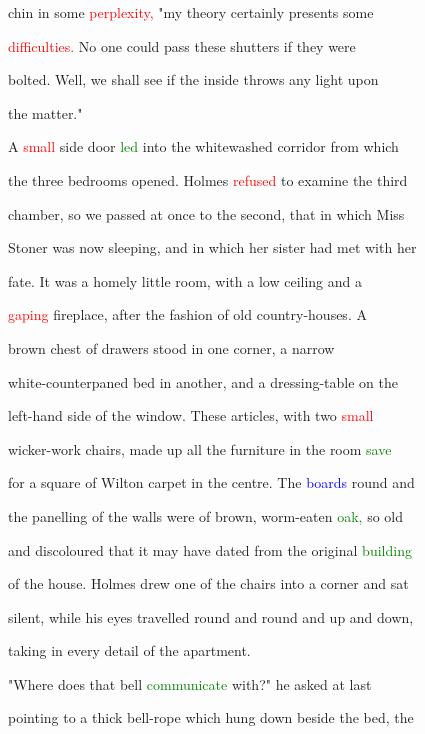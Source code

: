  chin in some \textcolor{red}{perplexity,} "my \textcolor{BurntOrange}{theory} certainly \textcolor{BurntOrange}{presents} some

 \textcolor{red}{difficulties.} No one could pass these shutters if they were

 bolted. Well, we shall see if the inside throws any light upon

 the matter."



 A \textcolor{red}{small} side door \textcolor{green}{led} into the whitewashed corridor from which

 the three bedrooms opened. Holmes \textcolor{red}{refused} to examine the third

 chamber, so we passed at once to the second, that in which Miss

 Stoner was now sleeping, and in which her sister had met with her

 \textcolor{BurntOrange}{fate.} It was a homely little room, with a low ceiling and a

 \textcolor{red}{gaping} fireplace, after the fashion of old country-houses. A

 brown chest of drawers stood in one corner, a narrow

 white-counterpaned bed in another, and a dressing-table on the

 left-hand side of the window. These articles, with two \textcolor{red}{small}

 wicker-work chairs, made up all the furniture in the room \textcolor{green}{save}

 for a square of Wilton carpet in the centre. The \textcolor{blue}{boards} round and

 the panelling of the walls were of brown, worm-eaten \textcolor{green}{oak,} so old

 and discoloured that it may have dated from the original \textcolor{green}{building}

 of the house. Holmes drew one of the chairs into a corner and sat

 silent, while his eyes travelled round and round and up and down,

 taking in every detail of the apartment.



 "Where does that bell \textcolor{green}{communicate} with?" he asked at last

 pointing to a thick bell-rope which hung down beside the bed, the

